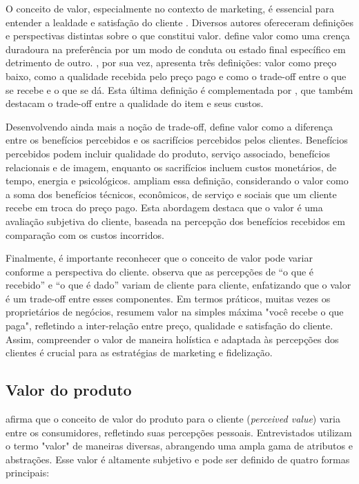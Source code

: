 O conceito de valor, especialmente no contexto de marketing, é essencial para entender a lealdade e satisfação do cliente \parencite{BOOK02}. Diversos autores ofereceram definições e perspectivas distintas sobre o que constitui valor. \textcite{BOOK03} define valor como uma crença duradoura na preferência por um modo de conduta ou estado final específico em detrimento de outro. \textcite{ARTICLE10}, por sua vez, apresenta três definições: valor como preço baixo, como a qualidade recebida pelo preço pago e como o trade-off entre o que se recebe e o que se dá. Esta última definição é complementada por \textcite{BOOK04}, que também destacam o trade-off entre a qualidade do item e seus custos.

Desenvolvendo ainda mais a noção de trade-off, \textcite{BOOK05} define valor como a diferença entre os benefícios percebidos e os sacrifícios percebidos pelos clientes. Benefícios percebidos podem incluir qualidade do produto, serviço associado, benefícios relacionais e de imagem, enquanto os sacrifícios incluem custos monetários, de tempo, energia e psicológicos. \textcite{BOOK06} ampliam essa definição, considerando o valor como a soma dos benefícios técnicos, econômicos, de serviço e sociais que um cliente recebe em troca do preço pago. Esta abordagem destaca que o valor é uma avaliação subjetiva do cliente, baseada na percepção dos benefícios recebidos em comparação com os custos incorridos.

Finalmente, é importante reconhecer que o conceito de valor pode variar conforme a perspectiva do cliente. \textcite{ARTICLE11} observa que as percepções de “o que é recebido” e “o que é dado” variam de cliente para cliente, enfatizando que o valor é um trade-off entre esses componentes. Em termos práticos, muitas vezes os proprietários de negócios, resumem valor na simples máxima "você recebe o que paga", refletindo a inter-relação entre preço, qualidade e satisfação do cliente. Assim, compreender o valor de maneira holística e adaptada às percepções dos clientes é crucial para as estratégias de marketing e fidelização.

\subsection{Valor do produto}

\textcite{ARTICLE10} afirma que o conceito de valor do produto para o cliente (\textit{perceived value}) varia entre os consumidores, refletindo suas percepções pessoais. Entrevistados utilizam o termo "valor" de maneiras diversas, abrangendo uma ampla gama de atributos e abstrações. Esse valor é altamente subjetivo e pode ser definido de quatro formas principais: 

